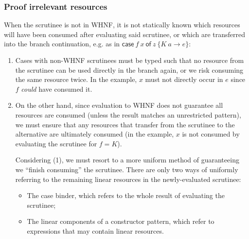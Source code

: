 \documentclass[acmsmall,review,anonymous,screen]{acmart}
\newcommand{\ccase}[2]{\mathsf{case}~#1~\mathsf{of}~#2}
\begin{document}


\subsubsection{Proof irrelevant resources}

When the scrutinee is not in WHNF, it is not statically known which resources
will have been consumed after evaluating said scrutinee, or which
are transferred into the branch continuation, e.g. as in $\ccase{f\ x}{z\ \{K\
a \rightarrow e\}}$:
\begin{enumerate}

    \item Cases with non-WHNF scrutinees must be typed such that no resource
    from the scrutinee can be used directly in the branch again, or we
    risk
    consuming the same resource twice. In the example, $x$ must not directly occur
    in $e$ since $f$ \emph{could} have consumed it.

    \item On the other hand, since evaluation to WHNF does not guarantee all
    resources are consumed (unless the result matches an
    unrestricted pattern), we must ensure that any resources that transfer from the
    scrutinee to the alternative are ultimately consumed (in the example, $x$
    is not consumed by evaluating the scrutinee for $f = K$).

    Considering (1), we must resort to a more uniform method of guaranteeing we
    ``finish consuming'' the scrutinee. There are only two ways of
    uniformly referring to the remaining linear resources in the newly-evaluated scrutinee:

        \begin{itemize}
            \item The case binder, which refers to the whole result of evaluating the scrutinee;
            \item The linear components of a constructor pattern, which refer to expressions that may contain linear resources.
        \end{itemize}

%
\end{enumerate}
\end{document}
